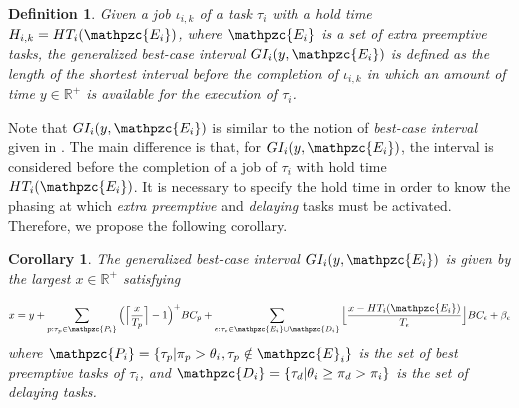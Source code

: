 \documentclass[fleqn]{article}
\newtheorem{corollary}{Corollary}
\newtheorem{definition}{Definition}
\begin{document}
\begin{definition}
	Given a job $\iota_{i,k}$ of a task $\tau_i$ with a hold time $H_{i,k}=HT_i(\mathpzc{E_i})$, where $\mathpzc{E_i}$ is a set of \textit{extra preemptive} tasks, the \textit{generalized best-case interval} $GI_i(y,  \mathpzc{E_i})$ is defined as the length of the shortest interval before the completion of $\iota_{i,k}$ in which an amount of time $y \in \mathbb{R}^+$ is available for the execution of $\tau_i$.
\end{definition}

Note that $GI_i(y,  \mathpzc{E_i})$ is similar to the notion of \textit{best-case interval} given in \cite{BLM13}. The main difference is that, for $GI_i(y,  \mathpzc{E_i})$, the interval is considered before the completion of a job of $\tau_i$ with hold time $HT_i(\mathpzc{E_i})$. It is necessary to specify the hold time in order to know the phasing at which \textit{extra preemptive} and \textit{delaying} tasks must be activated. Therefore, we propose the following corollary.

\begin{corollary}
	The \textit{generalized best-case interval} $GI_i(y,  \mathpzc{E_i})$ is given by the largest $x \in \mathbb{R}^+$ satisfying

\begin{align} \label{eq:g_best_interval}
x = y + \sum\limits_{p:\tau_p \in \mathpzc{P_i}} \Big( \Big\lceil  \dfrac{x}{T_p}\Big\rceil -1 \Big)^+  BC_p +
\sum\limits_{\epsilon:\tau_{\epsilon} \in \mathpzc{E_i} \cup \mathpzc{D_i}} \Big\lfloor  \dfrac{x-HT_i(\mathpzc{E_i})}{T_\epsilon}\Big\rfloor  BC_\epsilon+ 
\beta_e
\end{align}
where $\mathpzc{P_i} = \{\tau_p| \pi_p > \theta_i, \tau_p \notin \mathpzc{E}_i\}$ is the set of \textit{best preemptive} tasks of $\tau_i$, and $\mathpzc{D_i} = \{\tau_d| \theta_i \geq \pi_d > \pi_i\}$ is the set of \textit{delaying} tasks.
\end{corollary}
\end{document}
